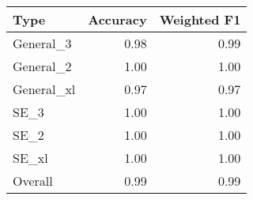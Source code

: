 \begin{tabular}{lrr}
\toprule
Type & Accuracy & Weighted F1 \\
\midrule
General_3 & 0.98 & 0.99 \\
General_2 & 1.00 & 1.00 \\
General_xl & 0.97 & 0.97 \\
SE_3 & 1.00 & 1.00 \\
SE_2 & 1.00 & 1.00 \\
SE_xl & 1.00 & 1.00 \\
Overall & 0.99 & 0.99 \\
\bottomrule
\end{tabular}
